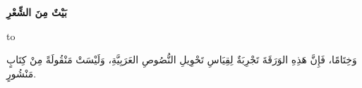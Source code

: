 \documentclass[12pt,a4paper]{article}
\begin{document}
{\raggedleft\large\bfseries\beginR بَيْتٌ مِنَ الشِّعْرِ\endR\par}\smallskip

\medskip\noindent\hbox to\linewidth{\hskip2em\beginR وَالصَّبْرُ زَادٌ إِذَا مَا الزَّادُ قَدْ عُدِمَا\endR\hfill\beginR العِلْمُ نُورٌ إِذَا مَا الدَّرْبُ أَظْلَمَ بِي\endR\hskip2em}\medskip

{\beginR وَخِتَامًا، فَإِنَّ هَذِهِ الوَرَقَةَ تَجْرِبَةٌ لِقِيَاسِ تَحْوِيلِ النُّصُوصِ العَرَبِيَّةِ، وَلَيْسَتْ مَنْقُولَةً مِنْ كِتَابٍ مَنْشُورٍ.\endR\par}
\end{document}
